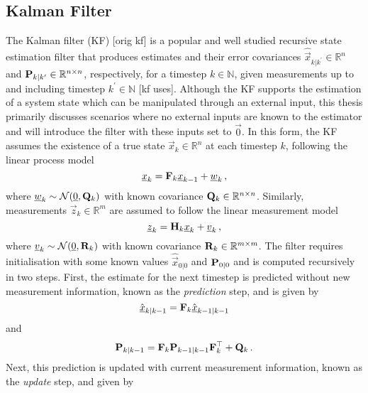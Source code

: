 \subsection{Kalman Filter}\label{subsec:prelims:kf}
The Kalman filter (KF) [orig kf] is a popular and well studied recursive state estimation filter that produces estimates and their error covariances $\hat{\vec{x}}_{k|k^\prime} \in \mathbb{R}^n$ and ${{\mathbf{P}}}_{k|k^\prime} \in \mathbb{R}^{n \times n}$, respectively, for a timestep $k \in \mathbb{N}$, given measurements up to and including timestep $k^\prime \in \mathbb{N}$ [kf uses]. Although the KF supports the estimation of a system state which can be manipulated through an external input, this thesis primarily discusses scenarios where no external inputs are known to the estimator and will introduce the filter with these inputs set to $\vec{0}$. In this form, the KF assumes the existence of a true state $\vec{x}_k \in \mathbb{R}^n$ at each timestep $k$, following the linear process model
\begin{equation}\label{eq:prelims:lin_gauss_process_model}
    {\underline{x}}_k = {{\mathbf{F}}}_k {\underline{x}}_{k-1} + {\underline{w}}_k\,,
\end{equation}
where ${\underline{w}}_k \sim \mathcal{N}({\underline{0}}, {{\mathbf{Q}}}_k)$ with known covariance ${{\mathbf{Q}}}_k \in \mathbb{R}^{n \times n}$. Similarly, measurements $\vec{z}_k \in \mathbb{R}^m$ are assumed to follow the linear measurement model
\begin{equation}\label{eq:prelims:lin_gauss_measurement_model}
    {\underline{z}}_k = {{\mathbf{H}}}_k {\underline{x}}_k + {\underline{v}}_k\,,
\end{equation}
where ${\underline{v}}_k \sim \mathcal{N}({\underline{0}}, {{\mathbf{R}}}_k)$ with known covariance ${{\mathbf{R}}}_k \in \mathbb{R}^{m \times m}$. The filter requires initialisation with some known values $\hat{\vec{x}}_{0|0}$ and ${{\mathbf{P}}}_{0|0}$ and is computed recursively in two steps. First, the estimate for the next timestep is predicted without new measurement information, known as the \textit{prediction} step, and is given by
\begin{equation}\label{eq:prelims:kf_est_predict}
    \hat{{\underline{x}}}_{k|k-1} = {{\mathbf{F}}}_k \hat{{\underline{x}}}_{k-1|k-1}
\end{equation}
and
\begin{equation}\label{eq:prelims:kf_cov_predict}
    {\ensuremath{{\mathbf{P}}}}_{k|k-1} = {{\mathbf{F}}}_k {{\mathbf{P}}}_{k-1|k-1} {{\mathbf{F}}}_k^\top + {{\mathbf{Q}}}_k\,.
\end{equation}
Next, this prediction is updated with current measurement information, known as the \textit{update} step, and given by
